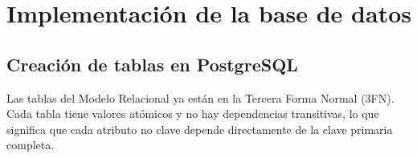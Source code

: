 \documentclass[12pt,a4paper]{article}
\begin{document}
\clearpage
\section{Implementación de la base de datos}
\subsection{Creación de tablas en PostgreSQL}
Las tablas del Modelo Relacional ya están en la Tercera Forma Normal (3FN). Cada tabla tiene valores atómicos y no hay dependencias transitivas, lo que significa que cada atributo no clave depende directamente de la clave primaria completa.




\end{document}
